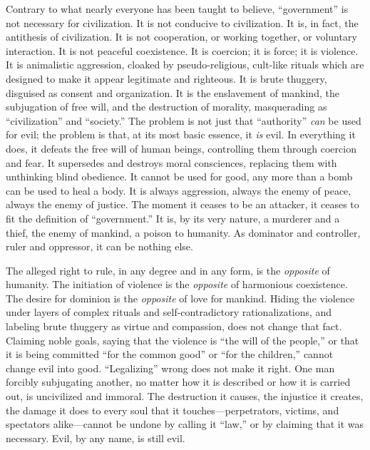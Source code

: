 \documentclass{book}
\begin{document}
Contrary to what nearly everyone has been taught to believe, \enquote{government} is not necessary for civilization. It is not conducive to civilization. It is, in fact, the antithesis of civilization. It is not cooperation, or working together, or voluntary interaction. It is not peaceful coexistence. It is coercion; it is force; it is violence. It is animalistic aggression, cloaked by pseudo-religious, cult-like rituals which are designed to make it appear legitimate and righteous. It is brute thuggery, disguised as consent and organization. It is the enslavement of mankind, the subjugation of free will, and the destruction of morality, masquerading as \enquote{civilization} and \enquote{society.} The problem is not just that \enquote{authority} \emph{can} be used for evil; the problem is that, at its most basic essence, it \emph{is} evil. In everything it does, it defeats the free will of human beings, controlling them through coercion and fear. It supersedes and destroys moral consciences, replacing them with unthinking blind obedience. It cannot be used for good, any more than a bomb can be used to heal a body. It is always aggression, always the enemy of peace, always the enemy of justice. The moment it ceases to be an attacker, it ceases to fit the definition of \enquote{government.} It is, by its very nature, a murderer and a thief, the enemy of mankind, a poison to humanity. As dominator and controller, ruler and oppressor, it can be nothing else.

The alleged right to rule, in any degree and in any form, is the \emph{opposite} of humanity. The initiation of violence is the \emph{opposite} of harmonious coexistence. The desire for dominion is the \emph{opposite} of love for mankind. Hiding the violence under layers of complex rituals and self-contradictory rationalizations, and labeling brute thuggery as virtue and compassion, does not change that fact. Claiming noble goals, saying that the violence is \enquote{the will of the people,} or that it is being committed \enquote{for the common good} or \enquote{for the children,} cannot change evil into good. \enquote{Legalizing} wrong does not make it right. One man forcibly subjugating another, no matter how it is described or how it is carried out, is uncivilized and immoral. The destruction it causes, the injustice it creates, the damage it does to every soul that it touches---perpetrators, victims, and spectators alike---cannot be undone by calling it \enquote{law,} or by claiming that it was necessary. Evil, by any name, is still evil.
\end{document}
